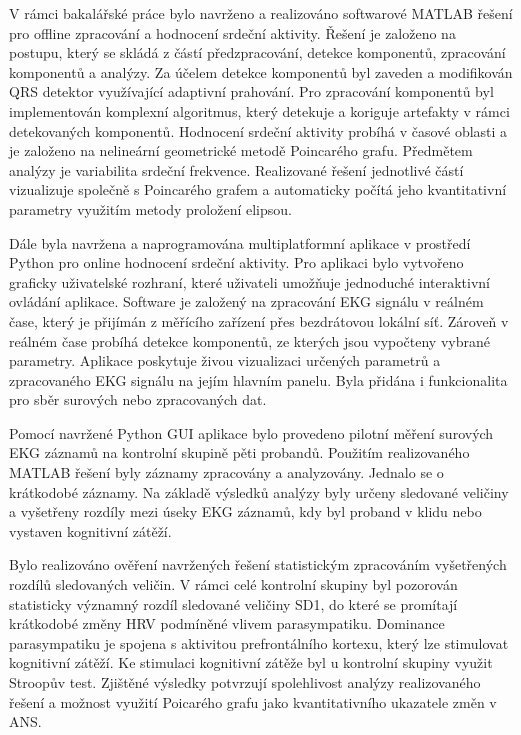 V rámci bakalářské práce bylo navrženo a realizováno softwarové MATLAB
řešení pro offline zpracování a hodnocení srdeční aktivity. Řešení je založeno
na postupu, který se skládá z částí předzpracování, detekce komponentů,
zpracování komponentů a analýzy. Za účelem detekce komponentů byl zaveden a
modifikován QRS detektor využívající adaptivní prahování. Pro zpracování
komponentů byl implementován komplexní algoritmus, který detekuje a koriguje
artefakty v rámci detekovaných komponentů. Hodnocení srdeční aktivity probíhá v
časové oblasti a je založeno na nelineární geometrické metodě Poincarého grafu.
Předmětem analýzy je variabilita srdeční frekvence. Realizované řešení
jednotlivé částí vizualizuje společně s Poincarého grafem a automaticky počítá
jeho kvantitativní parametry využitím metody proložení elipsou. 

Dále byla navržena a naprogramována multiplatformní aplikace v prostředí Python
pro online hodnocení srdeční aktivity. Pro aplikaci bylo vytvořeno graficky
uživatelské rozhraní, které uživateli umožňuje jednoduché interaktivní ovládání
aplikace. Software je založený na zpracování EKG signálu v reálném čase, který
je přijímán z měřícího zařízení přes bezdrátovou lokální síť. Zároveň v reálném
čase probíhá detekce komponentů, ze kterých jsou vypočteny vybrané parametry.
Aplikace poskytuje živou vizualizaci určených parametrů a zpracovaného EKG
signálu na jejím hlavním panelu. Byla přidána i funkcionalita pro sběr surových
nebo zpracovaných dat.

Pomocí navržené Python GUI aplikace bylo provedeno pilotní měření surových EKG
záznamů na kontrolní skupině pěti probandů. Použitím realizovaného MATLAB řešení
byly záznamy zpracovány a analyzovány. Jednalo se o krátkodobé záznamy. Na
základě výsledků analýzy byly určeny sledované veličiny a vyšetřeny rozdíly mezi
úseky EKG záznamů, kdy byl proband v klidu nebo vystaven kognitivní zátěží. 

Bylo realizováno ověření navržených řešení statistickým zpracováním vyšetřených
rozdílů sledovaných veličin. V rámci celé kontrolní skupiny byl pozorován
statisticky významný rozdíl sledované veličiny SD1, do které se promítají
krátkodobé změny HRV podmíněné vlivem parasympatiku. Dominance parasympatiku je
spojena s aktivitou prefrontálního kortexu, který lze stimulovat kognitivní
zátěží. Ke stimulaci kognitivní zátěže byl u kontrolní skupiny využit Stroopův
test. Zjištěné výsledky potvrzují spolehlivost analýzy realizovaného řešení a
možnost využití Poicarého grafu jako kvantitativního ukazatele změn v ANS. 

